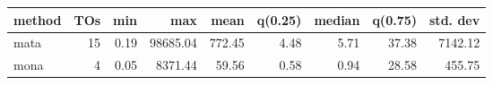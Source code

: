 \begin{tabular}{lrrrrrrrr}
\hline
 method   &   TOs &   min &      max &   mean &   q(0.25) &   median &   q(0.75) &   std. dev \\
\hline
 mata     & 15 &  0.19 & 98685.04 & 772.45 &      4.48 &     5.71 &     37.38 &    7142.12 \\
 mona     &  4 &  0.05 &  8371.44 &  59.56 &      0.58 &     0.94 &     28.58 &     455.75 \\
\hline
\end{tabular}

